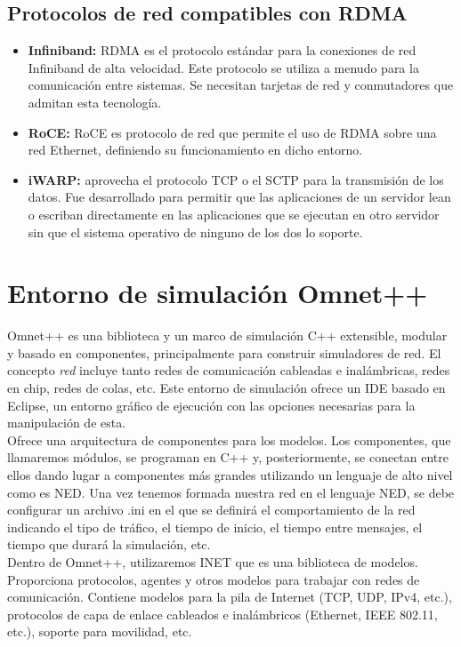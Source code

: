 \subsection{Protocolos de red compatibles con RDMA}
\begin{itemize}
	\item \textbf{Infiniband:} RDMA es el protocolo estándar para la conexiones de red Infiniband de alta velocidad. Este protocolo se utiliza a menudo para la comunicación entre sistemas. Se necesitan tarjetas de red y conmutadores que admitan esta tecnología.
	\item \textbf{RoCE:} RoCE es protocolo de red que permite el uso de RDMA sobre una red Ethernet, definiendo su funcionamiento en dicho entorno.
	\item \textbf{iWARP:} aprovecha el protocolo TCP o el SCTP para la transmisión de los datos. Fue desarrollado para permitir que las aplicaciones de un servidor lean o escriban directamente en las aplicaciones que se ejecutan en otro servidor sin que el sistema operativo de ninguno de los dos lo soporte.
\end{itemize}

\newpage

\section{Entorno de simulación Omnet++}
Omnet++ es una biblioteca y un marco de simulación C++ extensible, modular y basado en componentes, principalmente para construir simuladores de red. El concepto \textit{red} incluye tanto redes de comunicación cableadas e inalámbricas, redes en chip, redes de colas, etc. Este entorno de simulación ofrece un IDE basado en Eclipse, un entorno gráfico de ejecución con las opciones necesarias para la manipulación de esta.\\

Ofrece una arquitectura de componentes para los modelos. Los componentes, que llamaremos módulos, se programan en C++ y, posteriormente, se conectan entre ellos dando lugar a componentes más grandes utilizando un lenguaje de alto nivel como es NED. Una vez tenemos formada nuestra red en el lenguaje NED, se debe configurar un archivo .ini en el que se definirá el comportamiento de la red indicando el tipo de tráfico, el tiempo de inicio, el tiempo entre mensajes, el tiempo que durará la simulación, etc.\\

Dentro de Omnet++, utilizaremos INET que es una biblioteca de modelos. Proporciona protocolos, agentes y otros modelos para trabajar con redes de comunicación. Contiene modelos para la pila de Internet (TCP, UDP, IPv4, etc.), protocolos de capa de enlace cableados e inalámbricos (Ethernet, IEEE 802.11, etc.), soporte para movilidad, etc.\\

